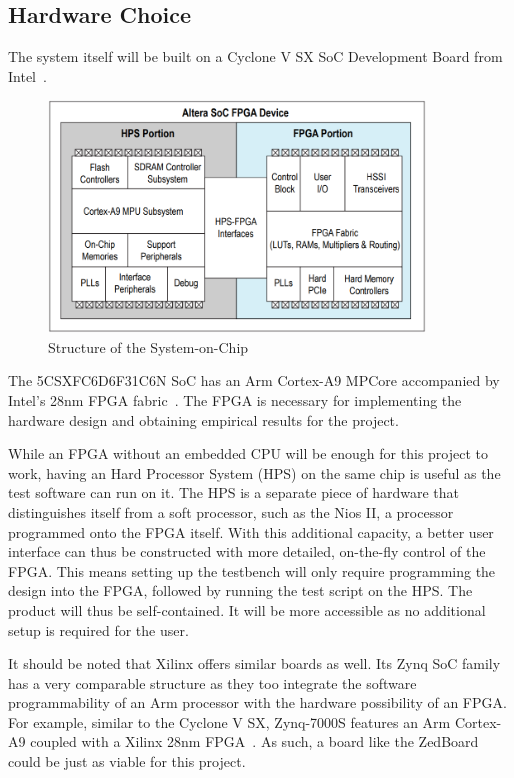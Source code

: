 \subsection{Hardware Choice}
The system itself will be built on a Cyclone V SX SoC Development Board from
Intel~\cite{Intel1}.

\begin{figure}[H]
  \centering
  \includegraphics[width=10cm]{img/SoCStructure}
  \caption{Structure of the System-on-Chip}
  \label{SoCStructure}
\end{figure}

The 5CSXFC6D6F31C6N SoC has an Arm Cortex-A9 MPCore accompanied by Intel's 28nm
FPGA fabric~\cite{Altera1}.
The FPGA is necessary for implementing the hardware design and obtaining
empirical results for the project.

While an FPGA without an embedded CPU will be enough for this project to work,
having an Hard Processor System (HPS) on the same chip is useful as the test
software can run on it.
The HPS is a separate piece of hardware that distinguishes itself from a soft
processor, such as the Nios II, a processor programmed onto the FPGA itself.
With this additional capacity, a better user interface can thus be constructed
with more detailed, on-the-fly control of the FPGA.
This means setting up the testbench will only require programming the design
into the FPGA, followed by running the test script on the HPS.
The product will thus be self-contained.
It will be more accessible as no additional setup is required for the user.

It should be noted that Xilinx offers similar boards as well.
Its Zynq SoC family has a very comparable structure as they too integrate the
software programmability of an Arm processor with the hardware possibility of
an FPGA.
For example, similar to the Cyclone V SX, Zynq-7000S features an Arm Cortex-A9
coupled with a Xilinx 28nm FPGA~\cite{Xilinx1}.
As such, a board like the ZedBoard~\cite{Xilinx2} could be just as viable for
this project.

